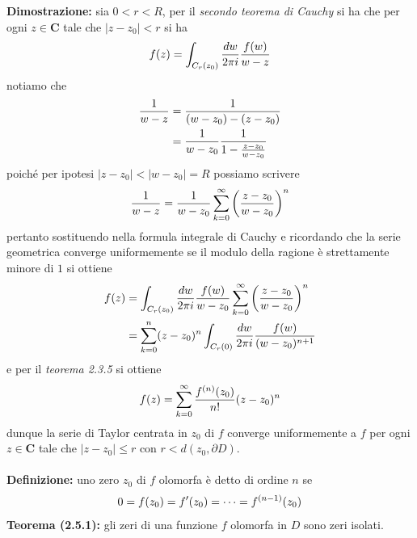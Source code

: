 \documentclass{article}
\begin{document}
\textbf{Dimostrazione:} sia $0 < r < R$, per il \textit{secondo teorema di Cauchy} si ha che per ogni $z \in \mathbf{C}$ tale che $|z - z_0| < r$ si ha
\begin{gather}
    f(z) = \int_{C_r(z_0)}\frac{dw}{2\pi i}\frac{f(w)}{w - z} \notag
\end{gather}
notiamo che
\begin{align}
    \frac{1}{w - z} &= \frac{1}{(w - z_0) - (z - z_0)} \notag \\
    &= \frac{1}{w - z_0}\frac{1}{1 - \frac{z - z_0}{w - z_0}} \notag
\end{align}
poiché per ipotesi $|z - z_0| < |w - z_0| = R$ possiamo scrivere
\begin{align}
    \frac{1}{w - z} = \frac{1}{w - z_0}\sum_{k = 0}^\infty\left(\frac{z - z_0}{w - z_0}\right)^n \notag
\end{align}
pertanto sostituendo nella formula integrale di Cauchy e ricordando che la serie geometrica converge uniformemente se il modulo della ragione è strettamente minore di $1$ si ottiene
\begin{align}
    f(z) &= \int_{C_r(z_0)}\frac{dw}{2\pi i}\frac{f(w)}{w - z_0}\sum_{k = 0}^\infty \left(\frac{z - z_0}{w - z_0}\right)^n \notag \\
    &= \sum_{k = 0}^n(z - z_0)^n\int_{C_r(0)}\frac{dw}{2\pi i}\frac{f(w)}{(w - z_0)^{n + 1}} \notag
\end{align}
e per il \textit{teorema 2.3.5} si ottiene
\begin{gather}
    f(z) = \sum_{k = 0}^\infty \frac{f^{(n)}(z_0)}{n!}(z - z_0)^n \notag
\end{gather}
dunque la serie di Taylor centrata in $z_0$ di $f$ converge uniformemente a $f$ per ogni $z \in \mathbf{C}$ tale che $|z - z_0| \leq r$ con $r < d(z_0, \partial D)$. \\ \\
\textbf{Definizione:} uno zero $z_0$ di $f$ olomorfa è detto di ordine $n$ se
\begin{gather}
    0 = f(z_0) = f'(z_0) = \dots = f^{(n-1)}(z_0) \notag
\end{gather}
\textbf{Teorema (2.5.1):} gli zeri di una funzione $f$ olomorfa in $D$ sono zeri isolati. \\
\end{document}
